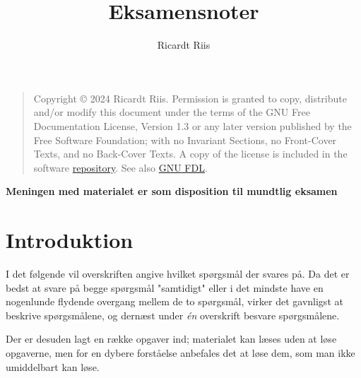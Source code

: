 \documentclass{article}
\title{Eksamensnoter}
\author{Ricardt Riis}
\begin{document}
\maketitle

\begin{quote}
    Copyright \copyright{}  2024  Ricardt Riis.
    Permission is granted to copy, distribute and/or modify this document
    under the terms of the GNU Free Documentation License, Version 1.3
    or any later version published by the Free Software Foundation;
    with no Invariant Sections, no Front-Cover Texts, and no Back-Cover Texts.
    A copy of the license is included in the software \href{https://github.com/Rikibig/exam-prep-math/}{repository}. See also \href{https://www.gnu.org/licenses/fdl-1.3.en.html}{GNU FDL}.
\end{quote}

\textbf{Meningen med materialet er som disposition til mundtlig eksamen}

\tableofcontents

\section*{Introduktion}
I det følgende vil overskriften angive hvilket spørgsmål der svares på. Da det
er bedst at svare på begge spørgsmål "samtidigt" eller i det mindste have en
nogenlunde flydende overgang mellem de to spørgsmål, virker det gavnligst at
beskrive spørgsmålene, og dernæst under \emph{én} overskrift besvare
spørgsmålene.

Der er desuden lagt en række opgaver ind; materialet kan læses uden at løse
opgaverne, men for en dybere forståelse anbefales det at løse dem, som man ikke
umiddelbart kan løse.
\end{document}
